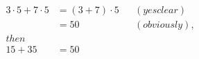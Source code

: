 \documentclass{article}
\begin{document}
\vspace*{\fill} \vspace*{-5ex}
\begin{align*}
3\cdot 5+7\cdot 5&=(3+7)
\cdot5 &&(yes clear)\\
&=50&&(obviously),\\
then\\
15+35 &=50
\end{align*}
\vspace*{\fill}
\end{document}
